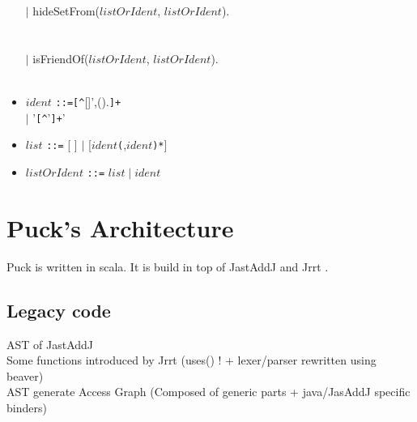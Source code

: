 \documentclass[]{article}
\begin{document}
\begin{itemize}
\begin{tabbing}
		\>$|$ hideSetFrom($listOrIdent$, $listOrIdent$).\\	
		\>\color{light-gray}{hideSetFrom(elementSet, interlopers)}\\
		\\
		
		\>$|$ isFriendOf($listOrIdent$, $listOrIdent$).\\
		\>\color{light-gray}{isFriendOf(scopeSet, beFriended)}\\
		
	\end{tabbing}

	\item \begin{tabbing}
		$ident$ \verb|::|\=\verb|=[^|[]',().\verb|]+|\\		
		\>$|$ '\verb|[^|'\verb|]+|'
	\end{tabbing}
	
	\item $list$ \verb|::=| [ ] $|$ [$ident$\verb|(|,$ident$\verb|)*|]\\		
	
	\item $listOrIdent$ \verb|::=| $list\; |\; ident$\\		
		
\end{itemize}


\section{Puck's Architecture}
Puck is written in scala. 
It is build in top of JastAddJ \cite{ekman2007jastaddj} and Jrrt \cite{jrrt, schafer2012accessibility}.
\subsection{Legacy code}
AST of JastAddJ\\
Some functions introduced by Jrrt (uses() ! + lexer/parser rewritten using beaver)\\
AST generate Access Graph (Composed of generic parts + java/JasAddJ specific binders)
\end{document}
